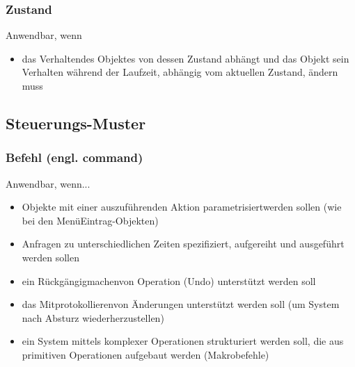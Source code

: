 \subsubsection{Zustand}
Anwendbar, wenn
\begin{itemize}
    \item das Verhaltendes Objektes von dessen Zustand abhängt und das Objekt sein Verhalten während der Laufzeit, abhängig vom aktuellen Zustand, ändern muss
\end{itemize}

\subsection{Steuerungs-Muster}


\subsubsection{Befehl (engl. command)}

Anwendbar, wenn...
\begin{itemize}
    \item Objekte mit einer auszuführenden Aktion parametrisiertwerden sollen (wie bei den MenüEintrag-Objekten)
    \item Anfragen zu unterschiedlichen Zeiten spezifiziert, aufgereiht und ausgeführt werden sollen
    \item ein Rückgängigmachenvon Operation (Undo) unterstützt werden soll
    \item das Mitprotokollierenvon Änderungen unterstützt werden soll (um System nach Absturz wiederherzustellen)
    \item ein System mittels komplexer Operationen strukturiert werden soll, die aus primitiven Operationen aufgebaut werden (Makrobefehle)
\end{itemize}

